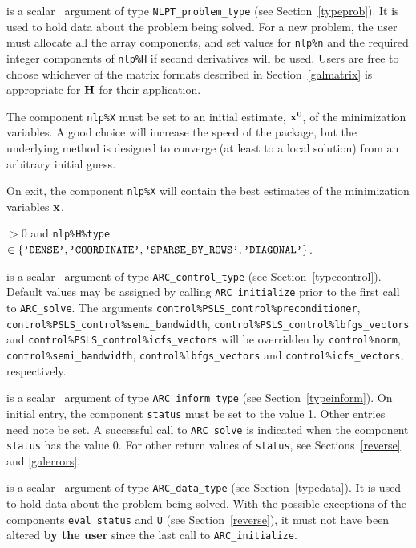 \documentclass{galahad}
\newcommand{\packagename}{ARC}
\begin{document}
\vspace*{-2mm}
\begin{description}
 is a scalar \intentinout\ argument of type
{\tt NLPT\_problem\_type}
(see Section~\ref{typeprob}).
It is used to hold data about the problem being solved.
For a new problem, the user must allocate all the array components,
and set values for {\tt nlp\%n}
and the required integer components of {\tt nlp\%H} if second derivatives
will be used.
Users are free to choose whichever
of the matrix formats described in Section~\ref{galmatrix}
is appropriate for ${\mathbf{H}}$ for their application.

\noindent
The component {\tt nlp\%X} must be set to an initial estimate, ${\mathbf{x}}^{0}$,
of the minimization variables. A good choice will increase the speed
of the package, but the underlying method is designed to converge (at least
to a local solution) from an arbitrary initial guess.

\noindent
On exit, the component {\tt nlp\%X} will contain the best estimates of the
minimization variables ${\mathbf{x}}$.

\noindent
{} $> 0$ and
{\tt nlp\%H\%type} $\in \{
  \mbox{\tt 'DENSE'}, \mbox{\tt 'COORDINATE'}, \mbox{\tt 'SPARSE\_BY\_ROWS'},
  \mbox{\tt 'DIAGONAL'} \}$.

 is a scalar \intentin\ argument of type
{\tt \packagename\_control\_type}
(see Section~\ref{typecontrol}). Default values may be assigned by calling
{\tt \packagename\_initialize} prior to the first call to
{\tt \packagename\_solve}. The arguments
{\tt control\%PSLS\_control\-\%preconditioner},
{\tt control\%PSLS\_control\%semi\_bandwidth},
{\tt control\%PSLS\_control\%lbfgs\_vectors} and
{\tt control\%PSLS\_control\%icfs\_vectors}
will be overridden by
{\tt control\%norm},
{\tt control\%semi\_bandwidth},
{\tt control\%lbfgs\_vectors} and
{\tt control\%icfs\_vectors}, respectively.

 is a scalar \intentinout\ argument of type
{\tt \packagename\_inform\_type}
(see Section~\ref{typeinform}).
On initial entry, the  component {\tt status} must be set to the value 1.
Other entries need note be set.
A successful call to
{\tt \packagename\_solve}
is indicated when the  component {\tt status} has the value 0.
For other return values of {\tt status}, see Sections~\ref{reverse} and
\ref{galerrors}.

 is a scalar \intentinout\ argument of type
{\tt \packagename\_data\_type}
(see Section~\ref{typedata}). It is used to hold data about the problem being
solved. With the possible exceptions of the components
{\tt eval\_status} and {\tt U} (see Section~\ref{reverse}),
it must not have been altered {\bf by the user} since the last call to
{\tt \packagename\_initialize}.


\end{description}
\end{document}
